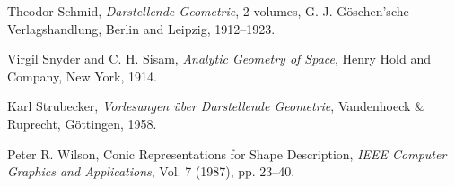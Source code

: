 \begin{thebibliography}{999}
     Theodor Schmid,
     {\em Darstellende Geometrie}, 2 volumes,
     G. J. G\"{o}schen'sche Verlagshandlung,
     Berlin and Leipzig, 1912--1923.

     Virgil Snyder and C. H. Sisam,
     {\em Analytic Geometry of Space},
     Henry Hold and Company, New York, 1914.

     Karl Strubecker,
     {\em Vorlesungen \"{u}ber Darstellende Geometrie},
     Vandenhoeck \& Ruprecht, G\"{o}ttingen, 1958.

     Peter R. Wilson,
     Conic Representations for Shape Description,
     {\em IEEE Computer Graphics and Applications},
     Vol. 7 (1987), pp. 23--40.

\end{thebibliography}



